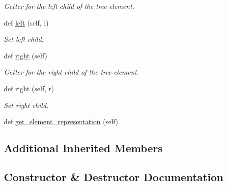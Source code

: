 \begin{DoxyCompactItemize}
\begin{DoxyCompactList}\small\item\em Getter for the left child of the tree element. \end{DoxyCompactList}\item 
def \hyperlink{classbridges_1_1kd__tree__element_1_1_k_d_tree_element_a784bad6511dae3a7c769672d2d3af14f}{left} (self, l)
\begin{DoxyCompactList}\small\item\em Set left child. \end{DoxyCompactList}\item 
def \hyperlink{classbridges_1_1kd__tree__element_1_1_k_d_tree_element_acbcfa46ba613daaf922d8b632b795a86}{right} (self)
\begin{DoxyCompactList}\small\item\em Getter for the right child of the tree element. \end{DoxyCompactList}\item 
def \hyperlink{classbridges_1_1kd__tree__element_1_1_k_d_tree_element_a89071f192bee403a44f92c86a5fdc49d}{right} (self, r)
\begin{DoxyCompactList}\small\item\em Set right child. \end{DoxyCompactList}\item 
def \hyperlink{classbridges_1_1kd__tree__element_1_1_k_d_tree_element_a4e08a6f2e4ff70be2b0dfd6eacdcf10e}{get\+\_\+element\+\_\+representation} (self)
\end{DoxyCompactItemize}
\subsection*{Additional Inherited Members}


\subsection{Constructor \& Destructor Documentation}
\mbox{\label{classbridges_1_1kd__tree__element_1_1_k_d_tree_element_adf6832855ce0ca7dfe126362a704cf70}} 
